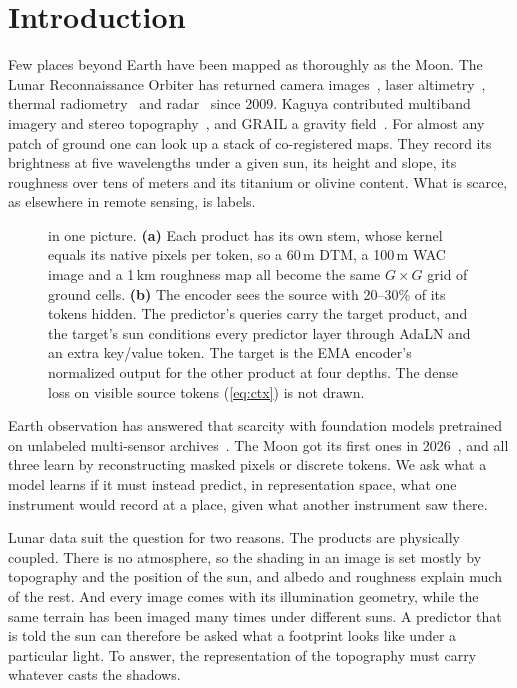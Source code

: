 \section{Introduction}
\label{sec:intro}

Few places beyond Earth have been mapped as thoroughly as the Moon. The Lunar Reconnaissance Orbiter has returned camera images~\cite{robinson2010lunar}, laser altimetry~\cite{smith2010lunar}, thermal radiometry~\cite{paige2010lunar} and radar~\cite{nozette2010lunar} since 2009. Kaguya contributed multiband imagery and stereo topography~\cite{kato2010kaguya,ohtake2008performance}, and GRAIL a gravity field~\cite{zuber2013gravity}. For almost any patch of ground one can look up a stack of co-registered maps. They record its brightness at five wavelengths under a given sun, its height and slope, its roughness over tens of meters and its titanium or olivine content. What is scarce, as elsewhere in remote sensing, is labels.

\begin{figure}[t]
  \centering
  \resizebox{\textwidth}{!}{}
  \caption{\method in one picture. \textbf{(a)} Each product has its own stem, whose kernel equals its native pixels per token, so a 60\,m DTM, a 100\,m WAC image and a 1\,km roughness map all become the same $G{\times}G$ grid of ground cells. \textbf{(b)} The encoder sees the source with 20--30\% of its tokens hidden. The predictor's queries carry the target product, and the target's sun conditions every predictor layer through AdaLN and an extra key/value token. The target is the EMA encoder's normalized output for the other product at four depths. The dense loss on visible source tokens (\cref{eq:ctx}) is not drawn.}
  \label{fig:overview}
\end{figure}

Earth observation has answered that scarcity with foundation models pretrained on unlabeled multi-sensor archives~\cite{cong2022satmae,fuller2023croma,xiong2024neural,jakubik2025terramind,tseng2025galileo,astruc2025anysat}. The Moon got its first ones in 2026~\cite{fraccaro2026multimodal,gironamata2026lunarfm,prasad2026moonstone}, and all three learn by reconstructing masked pixels or discrete tokens. We ask what a model learns if it must instead predict, in representation space, what one instrument would record at a place, given what another instrument saw there.

Lunar data suit the question for two reasons. The products are physically coupled. There is no atmosphere, so the shading in an image is set mostly by topography and the position of the sun, and albedo and roughness explain much of the rest. And every image comes with its illumination geometry, while the same terrain has been imaged many times under different suns. A predictor that is told the sun can therefore be asked what a footprint looks like under a particular light. To answer, the representation of the topography must carry whatever casts the shadows.

